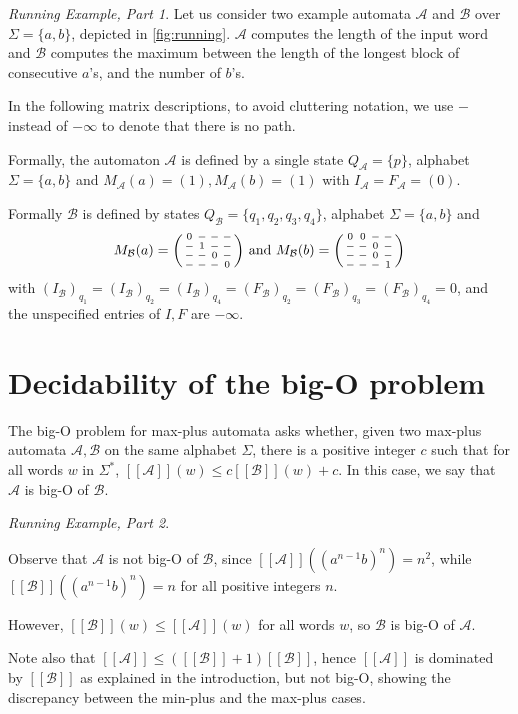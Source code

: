 \documentclass[10pt,a4paper]{amsart}
\theoremstyle{definition}
\numberwithin{equation}{section}
\theoremstyle{remark}
\newcommand{\autA}{\mathcal{A}}
\newcommand{\autB}{\mathcal{B}}
\newcommand{\brfunc}[1]{[\![#1]\!]}
\newcommand{\funcA}{\brfunc{\autA}}
\newcommand{\funcB}{\brfunc{\autB}}
\newcommand{\nopath}{-}
\newenvironment{smallpmatrix}
  {\left(\begin{smallmatrix}}
  {\end{smallmatrix}\right)}
\theoremstyle{remark}
\newtheorem{runningexample/}{Running Example, Part}
\newenvironment{runningexample}
  {\renewcommand{\qedsymbol}{\color{darkgray}\ensuremath{\lrcorner}}%
   \pushQED{\qed}\begin{runningexample/}}
  {\popQED\end{runningexample/}}
\begin{document}
\begin{runningexample}\label{eg:running}
Let us consider two example automata $\autA$ and $\autB$ over $\Sigma = \{a,b\}$, depicted in \cref{fig:running}.
$\autA$ computes the length of the input word and $\autB$ computes the maximum between the length of the longest block of consecutive $a$'s, and the number of $b$'s.

In the following matrix descriptions, to avoid cluttering notation, we use $\nopath$ instead of $-\infty$ to denote that there is no path.

Formally, the automaton $\autA$ is defined by a single state $Q_\autA = \{p\}$, alphabet $\Sigma = \{a,b\}$ and $M_{\autA}(a) = (1), M_{\autA}(b) = (1)$ with $I_\autA = F_\autA = (0)$. 

Formally $\autB$ is defined by states $Q_\autB = \{q_1,q_2,q_3,q_4\}$, alphabet $\Sigma = \{a,b\}$ and 
\[M_{\autB}(a) = 
\begin{smallpmatrix}
0 & \nopath & \nopath & \nopath\\
\nopath & 1 & \nopath & \nopath\\
\nopath & \nopath & 0 & \nopath\\
\nopath & \nopath & \nopath & 0
\end{smallpmatrix} \text{ and }M_{\autB}(b) = 
\begin{smallpmatrix}
0 & 0 & \nopath & \nopath\\
\nopath & \nopath & 0 & \nopath\\
\nopath & \nopath & 0 & \nopath\\
\nopath & \nopath & \nopath & 1
\end{smallpmatrix}\]
with $(I_\autB)_{q_1} =(I_\autB)_{q_2} = (I_\autB)_{q_4} =(F_\autB)_{q_2} = (F_\autB)_{q_3} = (F_\autB)_{q_4} = 0$, and the unspecified entries of $I,F$ are $-\infty$. 
\end{runningexample}

\section{Decidability of the big-O problem}
\label{sec:bigO}

The big-O problem for max-plus automata asks whether, given two max-plus automata $\autA,\autB$ on the same alphabet $\Sigma$, there is a positive integer $c$ such that for all words $w$ in $\Sigma^*$, $\funcA(w) \leq c\funcB(w) + c$. In this case, we say that $\autA$ is big-O of $\autB$.
\begin{runningexample}\label{re:notbig-O}

Observe that $\autA$ is not big-O of $\autB$, since $\funcA((a^{n-1}b)^n) = n^2$, while $\funcB((a^{n-1}b)^n) = n$ for all positive integers $n$.

However, $\funcB(w) \le \funcA(w)$ for all words $w$, so $\autB$ is big-O of $\autA$.

Note also that $\funcA \le (\funcB + 1)\funcB$, hence $\funcA$ is dominated by $\funcB$ as explained in the introduction, but not big-O, showing the discrepancy between the min-plus and the max-plus cases. 
\end{runningexample}
\end{document}
